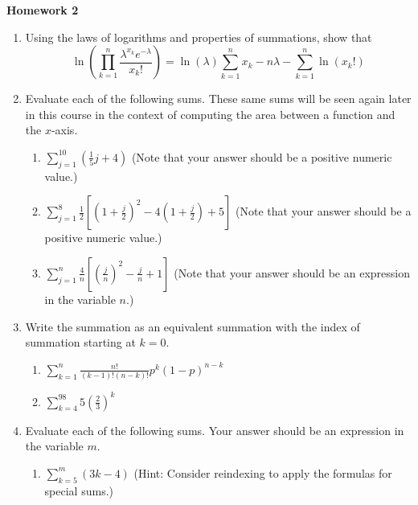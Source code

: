 \documentclass{article}
\begin{document}
    
    \begin{center}
        \large \textbf{Homework 2}
    \end{center}
                    \begin{enumerate}
                        \item Using the laws of logarithms and properties of summations, show that $$\ln\left(\prod_{k=1}^n \frac{\lambda^{x_k}e^{-\lambda}}{x_k!}\right)=\ln(\lambda)\sum_{k=1}^n x_k -n\lambda - \sum_{k=1}^n \ln(x_k!)$$
                        \item Evaluate each of the following sums.  These same sums will be seen again later in this course in the context of computing the area between a function and the $x$-axis.
                            \begin{enumerate}
                                \item $\displaystyle \sum_{j=1}^{10} \left(\frac{1}{5}j+4\right)$  (Note that your answer should be a positive numeric value.)
                                \item $\displaystyle \sum_{j=1}^{8} \frac{1}{2}\left[\left(1+\frac{j}{2} \right)^2 -4\left( 1+ \frac{j}{2}\right) + 5\right]$  (Note that your answer should be a positive numeric value.)
                                \item $\displaystyle \sum_{j=1}^{n} \frac{4}{n}\left[ \left(\frac{j}{n}\right)^2 - \frac{j}{n} + 1 \right]$  (Note that your answer should be an expression in the variable $n$.)
                            \end{enumerate}
                        \item Write the summation as an equivalent summation with the index of summation starting at $k=0$.
                            \begin{enumerate}
                                \item $\displaystyle \sum_{k=1}^n \frac{n!}{(k-1)!(n-k)!}p^k(1-p)^{n-k}$
                                \item $\displaystyle \sum_{k=4}^{98} 5\left(\frac{2}{3}\right) ^k$
                            \end{enumerate}
                        \item Evaluate each of the following sums.  Your answer should be an expression in the variable $m$.
                            \begin{enumerate}
                                \item $\displaystyle \sum_{k=5}^{m} (3k-4)$  (Hint: Consider reindexing to apply the formulas for special sums.)

\end{enumerate}
\end{enumerate}
\end{document}
